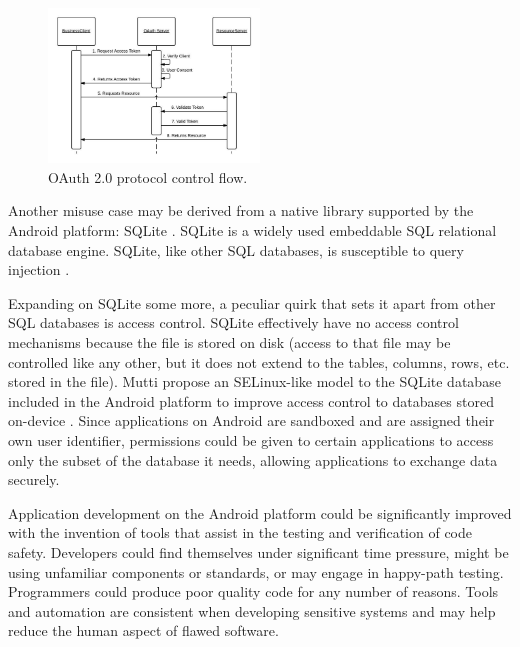 \begin{figure}[htbp]
    \centerline{\includegraphics[width=0.5\textwidth]{figures/OAuth2Oracle.png}}
    \caption{OAuth 2.0 protocol control flow.}
    \label{fig:OAuth2Oracle}
\end{figure}

Another misuse case may be derived from a native library supported by the Android platform: SQLite \cite{SQLite}.
SQLite is a widely used embeddable SQL relational database engine.
SQLite, like other SQL databases, is susceptible to query injection \cite{Maalouf2021}.

Expanding on SQLite some more, a peculiar quirk that sets it apart from other SQL databases is access control.
SQLite effectively have no access control mechanisms because the file is stored on disk (access to that file may be controlled like any other, but it does not extend to the tables, columns, rows, etc. stored in the file).
Mutti \etal propose an SELinux-like model to the SQLite database included in the Android platform to improve access control to databases stored on-device \cite{Mutti2015}.
Since applications on Android are sandboxed and are assigned their own user identifier, permissions could be given to certain applications to access only the subset of the database it needs, allowing applications to exchange data securely.

Application development on the Android platform could be significantly improved with the invention of tools that assist in the testing and verification of code safety.
Developers could find themselves under significant time pressure, might be using unfamiliar components or standards, or may engage in happy-path testing.
Programmers could produce poor quality code for any number of reasons.
Tools and automation are consistent when developing sensitive systems and may help reduce the human aspect of flawed software.
